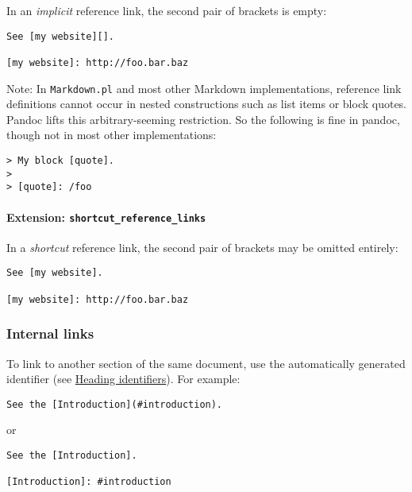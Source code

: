 \documentclass[
  a4paper,
]{article}
\begin{document}
In an \emph{implicit} reference link, the second pair of brackets is
empty:

\begin{verbatim}
See [my website][].

[my website]: http://foo.bar.baz
\end{verbatim}

Note: In \texttt{Markdown.pl} and most other Markdown implementations,
reference link definitions cannot occur in nested constructions such as
list items or block quotes. Pandoc lifts this arbitrary-seeming
restriction. So the following is fine in pandoc, though not in most
other implementations:

\begin{verbatim}
> My block [quote].
>
> [quote]: /foo
\end{verbatim}

\hypertarget{extension-shortcut_reference_links}{%
\paragraph{\texorpdfstring{Extension:
\texttt{shortcut\_reference\_links}}{Extension: shortcut\_reference\_links}}\label{extension-shortcut_reference_links}}

In a \emph{shortcut} reference link, the second pair of brackets may be
omitted entirely:

\begin{verbatim}
See [my website].

[my website]: http://foo.bar.baz
\end{verbatim}

\hypertarget{internal-links}{%
\subsubsection{Internal links}\label{internal-links}}

To link to another section of the same document, use the automatically
generated identifier (see
\protect\hyperlink{heading-identifiers}{Heading identifiers}). For
example:

\begin{verbatim}
See the [Introduction](#introduction).
\end{verbatim}

or

\begin{verbatim}
See the [Introduction].

[Introduction]: #introduction
\end{verbatim}
\end{document}
